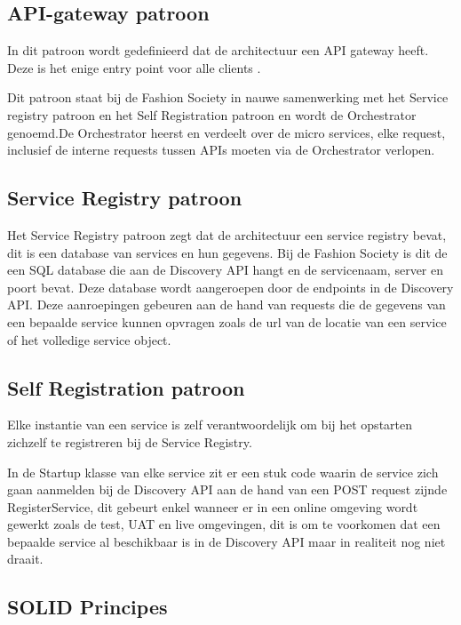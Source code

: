 \subsection{API-gateway patroon}
\label{subsec:API-gateway patroon}

 In dit patroon wordt gedefinieerd dat de architectuur een API gateway heeft. Deze is het enige entry point voor alle clients \autocite{Richardsonb}.
 
 Dit patroon staat bij de Fashion Society in nauwe samenwerking met het Service registry patroon en het Self Registration patroon en wordt de Orchestrator genoemd.De Orchestrator heerst en verdeelt over de micro services, elke request, inclusief de interne requests tussen APIs moeten via de Orchestrator verlopen.
 
 \subsection{Service Registry patroon}
 \label{subsec:Service Registry patroon}
 
 Het Service Registry patroon zegt dat de architectuur een service registry bevat, dit is een database van services en hun gegevens. \autocite{Richardsona} Bij de Fashion Society is dit de een SQL database die aan de Discovery API hangt en de servicenaam, server en poort bevat. Deze database wordt aangeroepen door de endpoints in de Discovery API. Deze aanroepingen gebeuren aan de hand van requests die de gegevens van een bepaalde service kunnen opvragen zoals de url van de locatie van een service of het volledige service object.
 
 \subsection{Self Registration patroon}
 \label{subsec:Self Registration patroon}
 
 Elke instantie van een service is zelf verantwoordelijk om bij het opstarten zichzelf te registreren bij de Service Registry. \autocite{Richardson}
 
 In de Startup klasse van elke service zit er een stuk code waarin de service zich gaan aanmelden bij de Discovery API aan de hand van een POST request zijnde RegisterService, dit gebeurt enkel wanneer er in een online omgeving wordt gewerkt zoals de test, UAT en live omgevingen, dit is om te voorkomen dat een bepaalde service al beschikbaar is in de Discovery API maar in realiteit nog niet draait.
 
 \subsection{SOLID Principes}
 \label{subsec:SOLID Principe}
 
